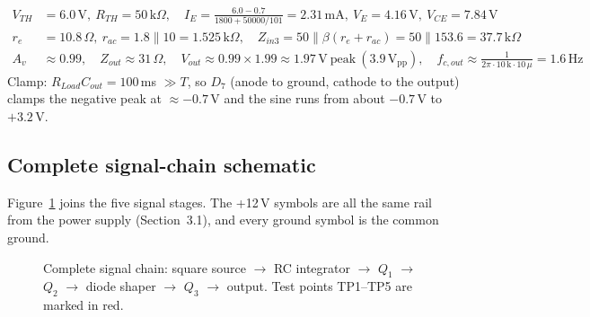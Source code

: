 \begin{tcolorbox}[colback=blue!3,colframe=blue!40!black,title=Calculations,fonttitle=\small\bfseries,boxrule=0.4pt]
\small
\begin{align*}
V_{TH}&=6.0\,\mathrm V,\ R_{TH}=50\,\mathrm{k}\Omega,\quad I_E=\frac{6.0-0.7}{1800+50000/101}=2.31\,\mathrm{mA},\ V_E=4.16\,\mathrm V,\ V_{CE}=7.84\,\mathrm V\\
r_e&=10.8\,\Omega,\ r_{ac}=1.8\parallel10=1.525\,\mathrm{k}\Omega,\quad Z_{in3}=50\parallel\beta(r_e+r_{ac})=50\parallel153.6=37.7\,\mathrm{k}\Omega\\
A_v&\approx0.99,\quad Z_{out}\approx31\,\Omega,\quad V_{out}\approx0.99\times1.99\approx1.97\,\mathrm V\ \text{peak}\ (3.9\,\mathrm{V_{pp}}),\quad f_{c,out}\approx\frac{1}{2\pi\cdot10\,\mathrm k\cdot10\,\mu}=1.6\,\mathrm{Hz}
\end{align*}
Clamp: $R_{Load}C_{out}=100$\,ms $\gg T$, so $D_7$ (anode to ground, cathode to the output) clamps the negative peak at $\approx-0.7$\,V and the sine runs from about $-0.7$\,V to $+3.2$\,V.
\end{tcolorbox}

\begin{landscape}
\section{Complete signal-chain schematic}
Figure~\ref{fig:full} joins the five signal stages. The +12\,V symbols are all the same rail from the power supply (Section~3.1), and every ground symbol is the common ground.


\begin{figure}[H]
\centering
{}
\caption{Complete signal chain: square source $\rightarrow$ RC integrator $\rightarrow$ $Q_1$ $\rightarrow$ $Q_2$ $\rightarrow$ diode shaper $\rightarrow$ $Q_3$ $\rightarrow$ output. Test points TP1--TP5 are marked in red.}
\label{fig:full}
\end{figure}
\end{landscape}

